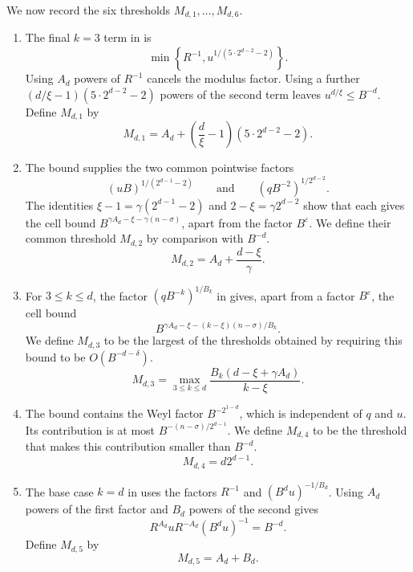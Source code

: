 \documentclass[reqno,a4paper,11pt]{amsart}
\numberwithin{equation}{section}
\newcommand{\eps}{\varepsilon}
\theoremstyle{plain}
\theoremstyle{definition}
\begin{document}
We now record the six thresholds \(M_{d,1},\ldots,M_{d,6}\).
\begin{enumerate}
\item The final \(k=3\) term in \cite[Lemma~4.7 and its proof]{bp} is
\[
 \min\left\{R^{-1},u^{1/(5\cdot2^{d-2}-2)}\right\}.
\]
Using \(A_d\) powers of \(R^{-1}\) cancels the modulus factor.
Using a further \((d/\xi-1)(5\cdot2^{d-2}-2)\) powers of the second term leaves \(u^{d/\xi}\leq B^{-d}\).
Define \(M_{d,1}\) by
\begin{equation}\label{eq:Md-cubic}
 M_{d,1}
 =A_d+\left(\frac d\xi-1\right)(5\cdot2^{d-2}-2).
\end{equation}

\item The bound \cite[Eq.~(4.3)]{bp} supplies the two common pointwise factors
\[
 (uB)^{1/(2^{d-1}-2)}
 \qquad\text{and}\qquad
 (qB^{-2})^{1/2^{d-2}}.
\]
The identities \(\xi-1=\gamma(2^{d-1}-2)\) and \(2-\xi=\gamma2^{d-2}\) show that each gives the cell bound \(B^{\gamma A_d-\xi-\gamma(n-\sigma)}\), apart from the factor \(B^\eps\).
We define their common threshold \(M_{d,2}\) by comparison with \(B^{-d}\).
\begin{equation}\label{eq:Md-common}
 M_{d,2}
 =A_d+\frac{d-\xi}{\gamma}.
\end{equation}

\item For \(3\leq k\leq d\), the factor \((qB^{-k})^{1/B_k}\) in \cite[Eq.~(4.4) and Proof of Lemma~4.5]{bp} gives, apart from a factor \(B^\eps\), the cell bound
\[
 B^{\gamma A_d-\xi-(k-\xi)(n-\sigma)/B_k}.
\]
We define \(M_{d,3}\) to be the largest of the thresholds obtained by requiring this bound to be \(O(B^{-d-\delta})\).
\begin{equation}\label{eq:Md-k-dependent}
 M_{d,3}
 =\max_{3\leq k\leq d}
 \frac{B_k(d-\xi+\gamma A_d)}{k-\xi}.
\end{equation}

\item The bound \cite[Eq.~(4.4)]{bp} contains the Weyl factor \(B^{-2^{1-d}}\), which is independent of \(q\) and \(u\).
Its contribution is at most \(B^{-(n-\sigma)/2^{d-1}}\).
We define \(M_{d,4}\) to be the threshold that makes this contribution smaller than \(B^{-d}\).
\begin{equation}\label{eq:Md-Weyl}
 M_{d,4}
 =d2^{d-1}.
\end{equation}

\item The base case \(k=d\) in \cite[Eq.~(4.6) and Proof of Lemma~4.6]{bp} uses the factors \(R^{-1}\) and \((B^du)^{-1/B_d}\).
Using \(A_d\) powers of the first factor and \(B_d\) powers of the second gives
\[
 R^{A_d}uR^{-A_d}(B^du)^{-1}
 =B^{-d}.
\]
Define \(M_{d,5}\) by
\begin{equation}\label{eq:Md-degree-d}
 M_{d,5}
 =A_d+B_d.
\end{equation}


\end{enumerate}
\end{document}
